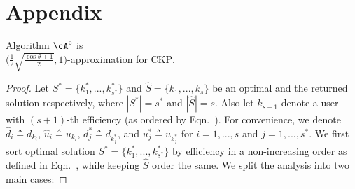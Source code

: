 \section*{Appendix}
\begin{customthm}{1}
Algorithm ${\cA^{\rm e}}$ is\\ $\big(\frac{1}{2} \sqrt{\frac{\cos \theta + 1}{2}},1\big)$-approximation for \textsc{CKP}.
\end{customthm}
\begin{proof}
 Let $S^*=\{k^*_1,...,k^*_{s^*}\}$ and $\hat S = \{k_1,...,k_s\}$ be an optimal and the  returned solution respectively, where $|S^*| = s^*$ and $|\hat S| = s$. Also let $k_{s+1}$ denote a user with $(s+1)$-th efficiency (as ordered by Eqn.~). For convenience, we denote $\hat d_i \triangleq d_{k_i}$, $\hat u_i \triangleq u_{k_i}$, $ d^*_j \triangleq d_{k^*_j}$, and  $ u^*_j \triangleq u_{k^*_j}$ for $i=1,...,s$ and $j=1,...,s^*$. We first sort optimal solution $S^*=\{k^*_1,...,k^*_{s^*}\}$ by efficiency in a non-increasing order as defined in Eqn.~, while keeping $\hat S$ order the same.
We split the analysis into two main cases:


\end{proof}
